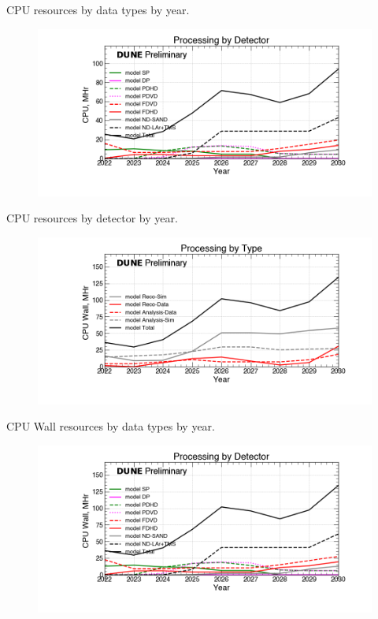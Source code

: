 \begin{table}[h]
\label{tab:CPU_Types}
\caption{CPU resources by data types by year.}
\end{table}
\pagebreak
\begin{figure}[ht]
\centering\includegraphics[height=0.4\textwidth]{NearTerm_2024-08-14-2030_noMWC_Processing-by-Detector-CPU.png}\end{figure}
\begin{table}[h]
\label{tab:CPU_Detectors}
\caption{CPU resources by detector by year.}
\end{table}
\pagebreak
\begin{figure}[ht]
\centering\includegraphics[height=0.4\textwidth]{NearTerm_2024-08-14-2030_noMWC_Processing-by-Type-CPU-Wall.png}\end{figure}
\begin{table}[h]
\label{tab:CPU Wall_Types}
\caption{CPU Wall resources by data types by year.}
\end{table}
\pagebreak
\begin{figure}[ht]
\centering\includegraphics[height=0.4\textwidth]{NearTerm_2024-08-14-2030_noMWC_Processing-by-Detector-CPU-Wall.png}\end{figure}
